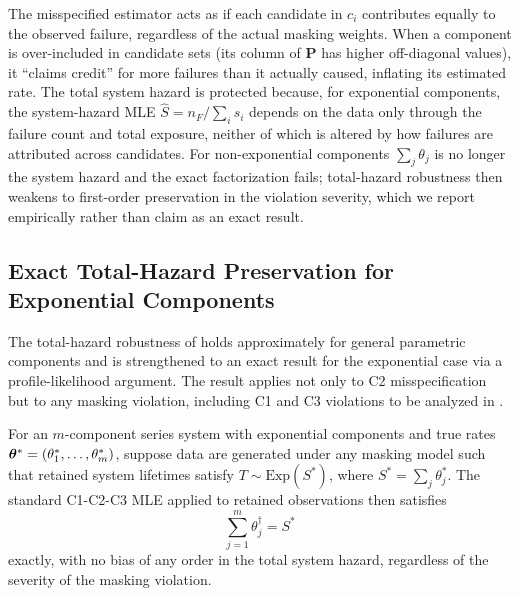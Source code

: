 \begin{remark}
\label{rem:interpretation}
The misspecified estimator acts as if each candidate in $c_i$ contributes
equally to the observed failure, regardless of the actual masking weights. When
a component is over-included in candidate sets (its column of $\mathbf{P}$ has
higher off-diagonal values), it ``claims credit'' for more failures than it
actually caused, inflating its estimated rate. The total system hazard is
protected because, for exponential components, the system-hazard MLE
$\hat S = n_F / \sum_i s_i$ depends on the data only through the failure
count and total exposure, neither of which is altered by how failures are
attributed across candidates. For non-exponential components $\sum_j \theta_j$
is no longer the system hazard and the exact factorization fails; total-hazard
robustness then weakens to first-order preservation in the violation severity,
which we report empirically rather than claim as an exact result.
\end{remark}

\subsection{Exact Total-Hazard Preservation for Exponential Components}
\label{sec:exact-hazard-exp}

The total-hazard robustness of  holds approximately
for general parametric components and is strengthened to an exact result for
the exponential case via a profile-likelihood argument. The result applies
not only to C2 misspecification but to any masking violation, including C1
and C3 violations to be analyzed in .

\begin{theorem}
\label{thm:exact-hazard-exp}
For an $m$-component series system with exponential components and true
rates $\bm{\theta}^* = (\theta_1^*, \ldots, \theta_m^*)$, suppose data are
generated under any masking model such that retained system lifetimes
satisfy $T \sim \mathrm{Exp}(S^*)$, where $S^* = \sum_j \theta_j^*$. The
standard C1-C2-C3 MLE applied to retained observations then satisfies
\begin{equation}
\label{eq:exact-hazard-exp}
    \sum_{j=1}^{m} \theta_j^\dagger = S^*
\end{equation}
exactly, with no bias of any order in the total system hazard, regardless of
the severity of the masking violation.
\end{theorem}

